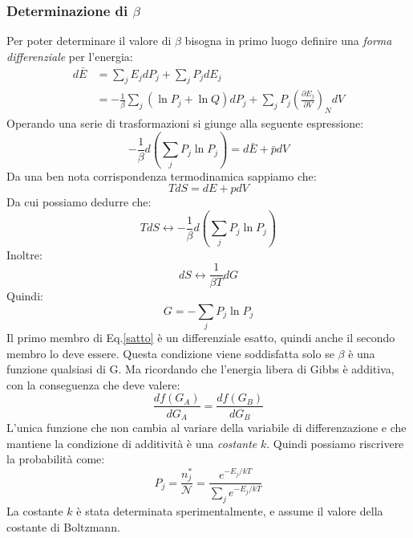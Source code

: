 \documentclass[oneside]{amsbook}
\numberwithin{section}{chapter}
\numberwithin{equation}{section}
\numberwithin{figure}{section}
\begin{document}
\subsubsection{Determinazione di $\beta$}
Per poter determinare il valore di $\beta$ bisogna in primo luogo definire una \emph{forma differenziale} per l'energia:
\begin{equation}
\begin{aligned}
d\bar{E}&=\sum_j E_j dP_j + \sum_j P_j dE_j\\
&= -\frac{1}{\beta}\sum_j \left(\ln P_j+ \ln Q\right)dP_j + \sum_j P_j \left(\frac{\partial E_j}{\partial V}\right)_N dV 
\end{aligned}
\end{equation}
Operando una serie di trasformazioni si giunge alla seguente espressione:
\begin{equation}
-\frac{1}{\beta}d\left(\sum_j P_j \ln P_j\right)= d\bar{E}+\bar{p}dV
\end{equation}
Da una ben nota corrispondenza termodinamica sappiamo che:
\begin{equation}
TdS=dE+pdV
\end{equation}
Da cui possiamo dedurre che:
\begin{equation}
TdS\leftrightarrow -\frac{1}{\beta}d\left(\sum_j P_j \ln P_j\right)
\end{equation}
Inoltre:
\begin{equation}
\label{satto}
dS \leftrightarrow \frac{1}{\beta T}dG
\end{equation}
Quindi:
\begin{equation}
G=-\sum_j P_j \ln P_j
\end{equation}
Il primo membro di Eq.\ref{satto} è un differenziale esatto, quindi anche il secondo membro lo deve essere. Questa condizione viene soddisfatta solo se $\beta $ è una funzione qualsiasi di G.
Ma ricordando che l'energia libera di Gibbs è additiva, con la conseguenza che deve valere:
\begin{equation}
\frac{df(G_A)}{dG_A}=\frac{df(G_B)}{dG_B}
\end{equation}
L'unica funzione che non cambia al variare della variabile di differenzazione e che mantiene la condizione di additività è una \emph{costante} $k$.
Quindi possiamo riscrivere la probabilità come:
\begin{equation}
P_j= \frac{ n_j^*}{\mathcal{N}} = \frac{ e^{-E_j/kT}}{\sum_j e^{- E_j/kT}} 
\end{equation}
La costante $k$ è stata determinata sperimentalmente, e assume il valore della costante di Boltzmann.
\end{document}
